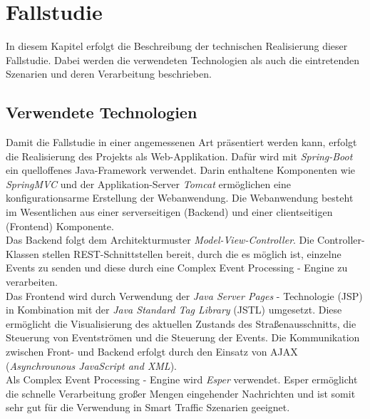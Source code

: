 \section{Fallstudie}
In diesem Kapitel erfolgt die Beschreibung der technischen Realisierung dieser Fallstudie. Dabei werden die verwendeten Technologien als auch die eintretenden Szenarien und deren Verarbeitung beschrieben.

\subsection{Verwendete Technologien}
Damit die Fallstudie in einer angemessenen Art präsentiert werden kann, erfolgt die Realisierung des Projekts als Web-Applikation. Dafür wird mit \textit{Spring-Boot} ein quelloffenes Java-Framework verwendet. Darin enthaltene Komponenten wie \textit{SpringMVC} und der Applikation-Server \textit{Tomcat} ermöglichen eine konfigurationsarme Erstellung der Webanwendung. Die Webanwendung besteht im Wesentlichen aus einer serverseitigen (Backend) und einer clientseitigen (Frontend) Komponente.\\
Das Backend folgt dem Architekturmuster \textit{Model-View-Controller}. Die Controller-Klassen stellen REST-Schnittstellen bereit, durch die es möglich ist, einzelne Events zu senden und diese durch eine Complex Event Processing - Engine zu verarbeiten.\\
Das Frontend wird durch Verwendung der \textit{Java Server Pages} - Technologie (JSP) in Kombination mit der \textit{Java Standard Tag Library} (JSTL) umgesetzt. Diese ermöglicht die Visualisierung des aktuellen Zustands des Straßenausschnitts, die Steuerung von Eventströmen und die Steuerung der Events. Die Kommunikation zwischen Front- und Backend erfolgt durch den Einsatz von AJAX (\textit{Asynchrounous JavaScript and XML}).\\
Als Complex Event Processing - Engine wird \textit{Esper} verwendet. Esper ermöglicht die schnelle Verarbeitung großer Mengen eingehender Nachrichten und ist somit sehr gut für die Verwendung in Smart Traffic Szenarien geeignet. 


